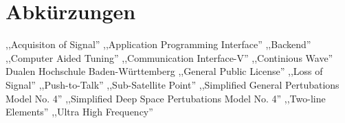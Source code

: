 
\chapter*{Abkürzungen}

\begin{acronym}[NORAD1]	%
		{,,Acquisiton of Signal''}	
		{,,Application Programming Interface''}	
		{,,Backend''}
		{,,Computer Aided Tuning''}
		{,,Communication Interface-V''}
		{,,Continious Wave''}	
	 {Dualen Hochschule Baden-Württemberg}
		{,,General Public License''}		
		{,,Loss of Signal''}
		{,,Push-to-Talk''}	
		{,,Sub-Satellite Point''}
		{,,Simplified General Pertubations Model No. 4''}
		{,,Simplified Deep Space Pertubations Model No. 4''}
		{,,Two-line Elements''}	
		{,,Ultra High Frequency''}
\end{acronym}
\clearpage
